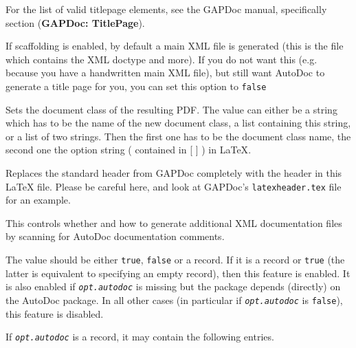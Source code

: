 \documentclass[a4paper,11pt]{report}
\begin{document}
{{{\begin{description}
\begin{description}
\begin{description}
 For the list of valid title\texttt{}page elements, see the \textsf{GAPDoc} manual, specifically section  (\textbf{GAPDoc: TitlePage}). 
\item[{\mbox{\texttt{\mdseries\slshape MainPage}}}]  If scaffolding is enabled, by default a main XML file is generated (this is
the file which contains the XML doctype and more). If you do not want this
(e.g. because you have a handwritten main XML file), but still want \textsf{AutoDoc} to generate a title page for you, you can set this option to \texttt{false} 
\item[{\mbox{\texttt{\mdseries\slshape document{\textunderscore}class}}}]  Sets the document class of the resulting PDF. The value can either be a string
which has to be the name of the new document class, a list containing this
string, or a list of two strings. Then the first one has to be the document
class name, the second one the option string ( contained in [ ] ) in {\LaTeX}. 
\item[{\mbox{\texttt{\mdseries\slshape latex{\textunderscore}header{\textunderscore}file}}}]  Replaces the standard header from \textsf{GAPDoc} completely with the header in this {\LaTeX} file. Please be careful here, and look at \textsf{GAPDoc}'s \texttt{latexheader.tex} file for an example. 
\end{description}
 
\item[{\mbox{\texttt{\mdseries\slshape autodoc}}}]  This controls whether and how to generate additional XML documentation files
by scanning for \textsf{AutoDoc} documentation comments. 

 The value should be either \texttt{true}, \texttt{false} or a record. If it is a record or \texttt{true} (the latter is equivalent to specifying an empty record), then this feature is
enabled. It is also enabled if \mbox{\texttt{\mdseries\slshape opt.autodoc}} is missing but the package depends (directly) on the \textsf{AutoDoc} package. In all other cases (in particular if \mbox{\texttt{\mdseries\slshape opt.autodoc}} is \texttt{false}), this feature is disabled. 

 

 If \mbox{\texttt{\mdseries\slshape opt.autodoc}} is a record, it may contain the following entries. 


\end{description}
\end{description}}}}
\end{document}
